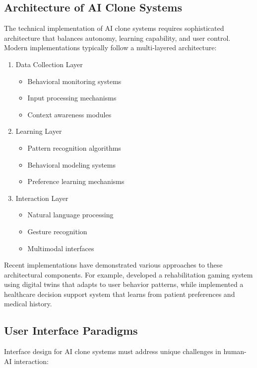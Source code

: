 \subsection{Architecture of AI Clone Systems}

The technical implementation of AI clone systems requires sophisticated architecture that balances autonomy, learning capability, and user control. Modern implementations typically follow a multi-layered architecture:

\begin{enumerate}
\item Data Collection Layer
\begin{itemize}
\item Behavioral monitoring systems
\item Input processing mechanisms
\item Context awareness modules
\end{itemize}

\item Learning Layer
\begin{itemize}
\item Pattern recognition algorithms
\item Behavioral modeling systems
\item Preference learning mechanisms
\end{itemize}

\item Interaction Layer
\begin{itemize}
\item Natural language processing
\item Gesture recognition
\item Multimodal interfaces
\end{itemize}
\end{enumerate}

Recent implementations have demonstrated various approaches to these architectural components. For example, \citet{lauer2024rehabilitation} developed a rehabilitation gaming system using digital twins that adapts to user behavior patterns, while \citet{kim2024healthcare} implemented a healthcare decision support system that learns from patient preferences and medical history.

\subsection{User Interface Paradigms}

Interface design for AI clone systems must address unique challenges in human-AI interaction:


